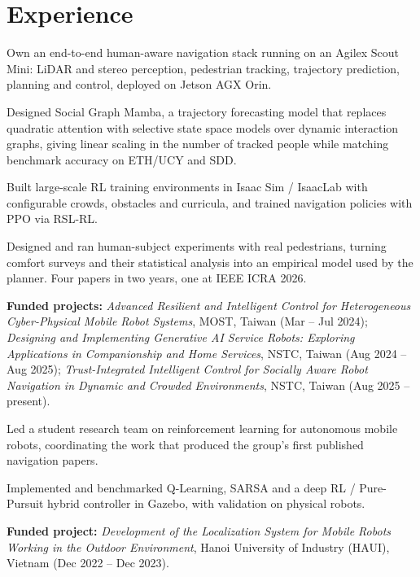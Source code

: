 \documentclass[10pt]{article}
\begin{document}
\section{Experience}

\begin{achievements}
  \item Own an end-to-end human-aware navigation stack running on an Agilex
        Scout Mini: LiDAR and stereo perception, pedestrian tracking, trajectory
        prediction, planning and control, deployed on Jetson AGX Orin.
  \item Designed Social Graph Mamba, a trajectory forecasting model that replaces
        quadratic attention with selective state space models over dynamic
        interaction graphs, giving linear scaling in the number of tracked people
        while matching benchmark accuracy on ETH/UCY and SDD.
  \item Built large-scale RL training environments in Isaac Sim / IsaacLab with
        configurable crowds, obstacles and curricula, and trained navigation
        policies with PPO via RSL-RL.
  \item Designed and ran human-subject experiments with real pedestrians,
        turning comfort surveys and their statistical analysis into an empirical
        model used by the planner. Four papers in two years, one at IEEE ICRA 2026.
\end{achievements}
\begin{detail}
{\fontsize{9}{11.5}\selectfont\textbf{Funded projects:} \emph{Advanced Resilient and
Intelligent Control for Heterogeneous Cyber-Physical Mobile Robot Systems}, MOST,
Taiwan (Mar -- Jul 2024); \emph{Designing and Implementing Generative AI Service
Robots: Exploring Applications in Companionship and Home Services}, NSTC, Taiwan
(Aug 2024 -- Aug 2025); \emph{Trust-Integrated Intelligent Control for Socially
Aware Robot Navigation in Dynamic and Crowded Environments}, NSTC, Taiwan
(Aug 2025 -- present).}
\end{detail}

\begin{achievements}
  \item Led a student research team on reinforcement learning for autonomous
        mobile robots, coordinating the work that produced the group's first
        published navigation papers.
  \item Implemented and benchmarked Q-Learning, SARSA and a deep RL / Pure-Pursuit
        hybrid controller in Gazebo, with validation on physical robots.
\end{achievements}
\begin{detail}
{\fontsize{9}{11.5}\selectfont\textbf{Funded project:} \emph{Development of the
Localization System for Mobile Robots Working in the Outdoor Environment},
Hanoi University of Industry (HAUI), Vietnam (Dec 2022 -- Dec 2023).}
\end{detail}
\end{document}
